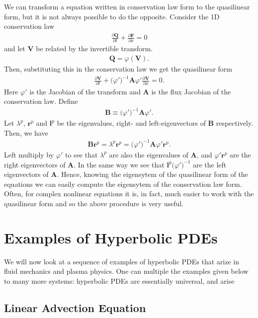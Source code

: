 \documentclass[12pt]{article}
\theoremstyle{definition}
\theoremstyle{definition}
\theoremstyle{definition}
\newcommand{\pfrac}[2]{\frac{\partial #1}{\partial #2}}
\newcommand{\mvec}[1]{\mathbf{#1}}
\begin{document}
We can transform a equation written in conservation law form to the
quasilinear form, but it is not always possible to do the
opposite. Consider the 1D conservation law
\begin{align}
  \pfrac{\mvec{Q}}{t} + \pfrac{\mvec{F}}{x} = 0
\end{align}
and let $\mvec{V}$ be related by the invertible transform.
\begin{align}
  \mvec{Q} = \varphi(\mvec{V}).
\end{align}
Then, substituting this in the conservation law we get the quasilinear
form
\begin{align}
  \pfrac{\mvec{V}}{t}
  +
  \big(\varphi' \big)^{-1} \mvec{A} \varphi' \pfrac{\mvec{V}}{x} = 0.
\end{align}
Here $\varphi'$ is the Jacobian of the transform and $\mvec{A}$ is the
flux Jacobian of the conservation law. Define
\begin{align}
  \mvec{B} \equiv \big(\varphi' \big)^{-1} \mvec{A} \varphi'.
\end{align}
Let $\lambda^p$, $\mvec{r}^p$ and $\mvec{l}^p$ be the eigenvalues,
right- and left-eigenvectors of $\mvec{B}$ respectively. Then, we have
\begin{align}
  \mvec{B}\mvec{r}^p 
  = \lambda^p \mvec{r}^p
  = \big(\varphi' \big)^{-1} \mvec{A} \varphi' \mvec{r}^p.
\end{align}
Left multiply by $\varphi'$ to see that $\lambda^p$ are also the
eigenvalues of $\mvec{A}$, and $\varphi' \mvec{r}^p$ are the right
eigenvectors of $\mvec{A}$. In the same way we see that
$\mvec{l}^p \big(\varphi' \big)^{-1}$ are the left eigenvectors of
$\mvec{A}$. Hence, knowing the eigensytem of the quasilinear form of
the equations we can easily compute the eigensytem of the conservation
law form. Often, for complex nonlinear equations it is, in fact, much
easier to work with the quasilinear form and so the above procedure
is very useful.

\section{Examples of Hyperbolic PDEs}

We will now look at a sequence of examples of hyperbolic PDEs that
arize in fluid mechanics and plasma physics. One can multiple the
examples given below to many more systems: hyperbolic PDEs are
essentially universal, and arise 

\subsection{Linear Advection Equation}
\end{document}
